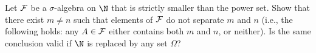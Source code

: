 \documentclass[12pt]{article}
\begin{document}
\begin{problem}
    Let $\mathcal F$ be a $\sigma$-algebra on $\N$ that is strictly smaller than
    the power set.
    Show that there exist $m \ne n$ such that elements of $\mathcal F$ do not
    separate $m$ and $n$ (i.e., the following holds: any $A \in \mathcal F$
    either contains both $m$ and $n$, or neither).
    Is the same conclusion valid if $\N$ is replaced by any set $\Omega$?
\end{problem}
\begin{solution}
    
\end{solution}
\end{document}
